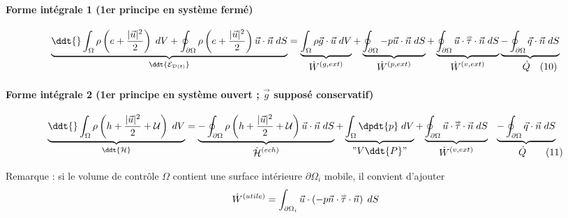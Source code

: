 \paragraph{Forme intégrale 1 (1er principe en système fermé) }
\begin{equation*}
		\underbrace{\ddt{} \int_{\Omega} \rho \left( e + \frac{ |\vec{u}|^2}{2} \right) \; dV + \oint_{\partial \Omega}  \rho \left( e + \frac{ |\vec{u}|^2}{2} \right) \vec{u} \cdot \vec{n} \; dS
		}_{\ddt{ {\cal E}_{{\cal D}(t)}  }}		 
		= \underbrace{\int_{\Omega} \rho \vec{g} \cdot \vec{u} \; dV
		}_{\displaystyle \dot{W}^{(g,ext)}} 
		+ \underbrace{ \oint_{\partial \Omega} -p \vec{u} \cdot  \vec{n}   \; dS 
		}_{\displaystyle \dot{W}^{(p,ext)}} 
		+ \underbrace{ \oint_{\partial \Omega} \vec{u} \cdot  \mytensor{\tau} \cdot \vec{n}  \; dS 
		}_{\displaystyle \dot{W}^{(v,ext)}} 
		 \underbrace{ - \oint_{\partial \Omega} \vec{q} \cdot \vec{n} \; dS
		}_{\displaystyle \qquad \dot{Q} \quad (10)} 
		\label{eq:bilan_global_eulerien_e1}
\end{equation*}
\paragraph{Forme intégrale 2 (1er principe en système ouvert ; $\vec g$ supposé conservatif)}
\begin{equation*}
		\underbrace{
		\ddt{} \int_{\Omega} \rho \left( h + \frac{ |\vec{u}|^2}{2} + {\cal U} \right) \; dV
		 }_{\ddt{\cal H} }	
		= \underbrace{-  \oint_{\partial \Omega}  \rho \left( h + \frac{ |\vec{u}|^2}{2} + {\cal U} \right) \vec{u} \cdot \vec{n} \; dS
		}_{\displaystyle \dot{\cal H}^{(ech)}} 
		+ \underbrace{ \int _{\Omega} \dpdt{p}\; dV
		}_{ \displaystyle "V \ddt{P}"  } 
		+ \underbrace{ \oint_{\partial \Omega} \vec{u} \cdot \mytensor{\tau} \cdot \vec{n}   \; dS 
		}_{\displaystyle \dot{W}^{(v,ext)}} 
		 \underbrace{ - \oint_{\partial \Omega} \vec{q} \cdot \vec{n} \; dS
		}_{\displaystyle \qquad \quad \dot{Q} \qquad (11)} 
		\label{eq:bilan_global_eulerien_e2}
\end{equation*}
\setcounter{equation}{11}

Remarque : si le volume de contrôle ${\Omega}$ contient une surface intérieure ${\partial \Omega}_i$ mobile,
il convient d'ajouter
$$
\dot{W}^{(utile)} = \int_{{\partial \Omega}_i}  \vec{u} \cdot \left( -p \vec{n}  \cdot  \accentset{\Rightarrow}{\tau} \cdot \vec{n} \right)  \; dS
$$ 





